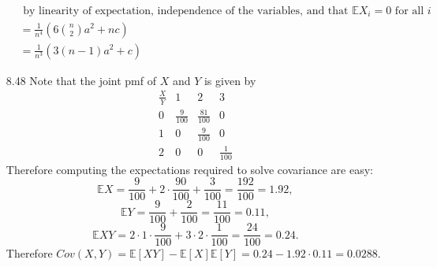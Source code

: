 \documentclass[12pt, letterpaper]{article}
\newcommand{\E}{\mathbb{E}}
\begin{document}
\begin{enumerate}
\begin{align*}
		&\text{ by linearity of expectation, independence of the variables, and that } \E X_i = 0 \text{ for all } i\\
		&= \frac{1}{n^4} (6 \binom{n}{2}a^2 + nc)\\
		&= \frac{1}{n^3} (3(n-1)a^2 + c)
	\end{align*}
	\item[8.48]  Note that the joint pmf of $X$ and $Y$ is given by 
	$$
		\begin{matrix}
			\frac{X}{Y} & 1 & 2 & 3\\
			0 & \frac{9}{100} & \frac{81}{100} & 0\\
			1 & 0 & \frac{9}{100} & 0\\
			2 & 0 & 0 & \frac{1}{100}
		\end{matrix}			
	$$
	Therefore computing the expectations required to solve covariance are easy:\\
	$$\E X = \frac{9}{100} + 2 \cdot \frac{90}{100} + \frac{3}{100} = \frac{192}{100} = 1.92,$$ $$\E Y = \frac{9}{100} + \frac{2}{100} = \frac{11}{100} = 0.11,$$ $$\E XY = 2 \cdot 1 \cdot \frac{9}{100} + 3 \cdot 2 \cdot \frac{1}{100} = \frac{24}{100} = 0.24.$$  Therefore $Cov(X,Y) = \E[XY] - \E[X]\E[Y] = 0.24 - 1.92\cdot 0.11 = 0.0288$. 
\end{enumerate}
\end{document}

